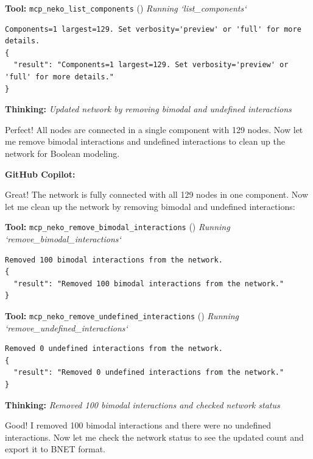 \documentclass[11pt,a4paper]{article}
\begin{document}
\begin{toolokbox}
\textbf{Tool:} \texttt{mcp\_neko\_list\_components} (\checkmark)
\textit{Running `list\_components`}
\begin{lstlisting}
Components=1 largest=129. Set verbosity='preview' or 'full' for more details.
{
  "result": "Components=1 largest=129. Set verbosity='preview' or 'full' for more details."
}
\end{lstlisting}
\end{toolokbox}
\begin{thinkbox}
\textbf{Thinking:} \textit{Updated network by removing bimodal and undefined interactions}

Perfect! All nodes are connected in a single component with 129 nodes. Now let me remove bimodal interactions and undefined interactions to clean up the network for Boolean modeling.

\end{thinkbox}
\begin{copilotbox}
\textbf{GitHub Copilot:}

Great! The network is fully connected with all 129 nodes in one component. Now let me clean up the network by removing bimodal and undefined interactions:

\end{copilotbox}
\begin{toolokbox}
\textbf{Tool:} \texttt{mcp\_neko\_remove\_bimodal\_interactions} (\checkmark)
\textit{Running `remove\_bimodal\_interactions`}
\begin{lstlisting}
Removed 100 bimodal interactions from the network.
{
  "result": "Removed 100 bimodal interactions from the network."
}
\end{lstlisting}
\end{toolokbox}
\begin{toolokbox}
\textbf{Tool:} \texttt{mcp\_neko\_remove\_undefined\_interactions} (\checkmark)
\textit{Running `remove\_undefined\_interactions`}
\begin{lstlisting}
Removed 0 undefined interactions from the network.
{
  "result": "Removed 0 undefined interactions from the network."
}
\end{lstlisting}
\end{toolokbox}
\begin{thinkbox}
\textbf{Thinking:} \textit{Removed 100 bimodal interactions and checked network status}

Good! I removed 100 bimodal interactions and there were no undefined interactions. Now let me check the network status to see the updated count and export it to BNET format.

\end{thinkbox}
\end{document}
